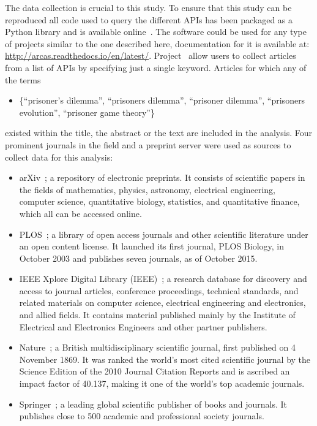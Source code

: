 \documentclass{article}
\theoremstyle{definition}
\begin{document}
The data collection is crucial to this study. To ensure that this study can be
reproduced all code used to query the different APIs has been packaged as a
Python library and is available online~\cite{nikoleta_2017}. The software could
be used for any type of projects similar to the one described here,
documentation for it is available at:
\url{http://arcas.readthedocs.io/en/latest/}. Project~\cite{nikoleta_2017} allow
users to collect articles from a list of APIs by specifying just a single
keyword. Articles for which any of the terms

\begin{itemize}
    \item \{``prisoner's dilemma'',
    ``prisoners dilemma'', ``prisoner dilemma'', ``prisoners evolution'', ``prisoner
    game theory''\}
\end{itemize}

existed within the title, the abstract or the text are included
in the analysis. Four prominent journals in the field and a preprint server
were used as sources to collect data for this analysis:

\begin{multicols}{2}
    \begin{itemize}
        \item arXiv~\cite{mckiernan2000}; a repository of electronic preprints.
        It consists of scientific
        papers in the fields of mathematics, physics, astronomy, electrical engineering,
        computer science, quantitative biology, statistics, and quantitative finance,
        which all can be accessed online.
        \item PLOS~\cite{plos}; a library of open access journals and other scientific literature
        under an open content license. It launched its first journal, PLOS Biology,
        in October 2003 and publishes seven journals, as of October 2015.
        \item IEEE Xplore Digital Library (IEEE)~\cite{ieee}; a research database for discovery
        and access to journal articles, conference proceedings, technical standards,
        and related materials on computer science, electrical engineering and electronics,
        and allied fields. It contains material published mainly by the Institute of
        Electrical and Electronics Engineers and other partner publishers. 
        \item Nature~\cite{nature}; a British multidisciplinary scientific journal,
        first published on 4 November 1869. It was ranked the world's most cited
        scientific journal by the Science Edition of the 2010 Journal Citation Reports
        and is ascribed an impact factor of 40.137, making it one of the world's
        top academic journals.
        \item Springer~\cite{springer}; a leading global scientific publisher of
        books and journals. It publishes close to 500 academic and professional
        society journals.
    \end{itemize}
\end{multicols}
\end{document}
